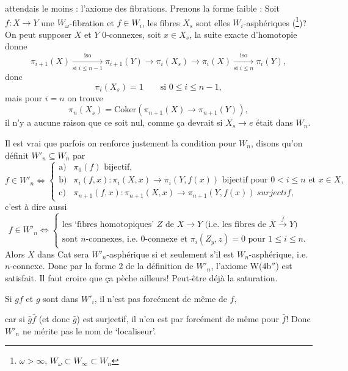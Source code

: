 \documentclass[11pt]{article}
\newcommand{\printedpage}[1]{\marginpar{\footnotesize p.~#1}}
\newcommand{\msp}[1]{\marginpar{\footnotesize [#1]}}
\begin{document}
\printedpage{14}
attendais le moins : l'axiome des fibrations. Prenons la forme faible : Soit $f : X \longrightarrow Y$ une $W_\omega$-fibration et $f \in W_i$, les fibres $X_s$ sont elles $W_i$-asphériques (\footnote[37]{$\omega > \infty$, $W_\omega \subset W_\infty \subset W_n$})? On peut supposer $X$ et $Y$ 0-connexes, soit $x \in X_s$, la suite exacte d'homotopie donne
\[
\pi_{i+1}(X) \xrightarrow[\text{si } i \leq n-1]{\text{iso}} \pi_{i+1}(Y) \longrightarrow \pi_i(X_s) \longrightarrow \pi_i(X) \xrightarrow[\text{si } i \leq n]{\text{iso}} \pi_i(Y),
\]
donc
\[
\pi_i(X_s) = 1 \qquad \text{si } 0 \leq i \leq n-1,
\]
mais pour $i = n$ on trouve\msp{page 17}
\[
\pi_n(X_s) = \mathrm{Coker}\left(\pi_{n+1}(X) \longrightarrow \pi_{n+1}(Y)\right),
\]
il n'y a aucune raison que ce soit nul, comme ça devrait si $X_s \longrightarrow e$ était dans $W_n$.

Il est vrai que parfois on renforce justement la condition pour $W_n$, disons qu'on définit $W'_n \subseteq W_n$ par
\[
f \in W'_n \iff \left\{
\begin{array}{ll}
\text{a)} & \pi_0(f) \text{ bijectif,} \\[1ex]
\text{b)} & \pi_i(f,x) : \pi_i(X,x) \longrightarrow \pi_i(Y,f(x)) \text{ bijectif pour } 0 < i \leq n \text{ et } x \in X, \\[1ex]
\text{c)} & \pi_{n+1}(f,x) : \pi_{n+1}(X,x) \longrightarrow \pi_{n+1}(Y,f(x)) \ \textit{surjectif,}
\end{array}
\right.
\]
c'est à dire aussi
\[
f \in W'_n \iff \left\{
\begin{array}{l}
\text{les `fibres homotopiques' } Z \text{ de } X \longrightarrow Y \text{ (i.e. les fibres de } \bar{X} \xrightarrow{\bar{f}} Y\text{)} \\
\text{sont } n\text{-connexes, i.e. 0-connexe et } \pi_i(Z_y,z) = 0 \text{ pour } 1 \leq i \leq n.
\end{array}
\right.
\]
Alors $X$ dans Cat sera $W'_n$-asphérique si et seulement s'il est $W_n$-asphérique, i.e. $n$-connexe. Donc par la forme 2 de la définition de $W'_n$, l'axiome W(4b$''$) est satisfait. Il faut croire que ça pèche ailleurs! Peut-être déjà la saturation.

\hspace*{3em}Si $gf$ et $g$ sont dans $W'_i$, il n'est pas forcément de même de $f$,

car si $\bar{g}\bar{f}$ (et donc $\bar{g}$) est surjectif, il n'en est par forcément de même pour $\bar{f}$! Donc $W'_n$ ne mérite pas le nom de `localiseur'. %
\end{document}
